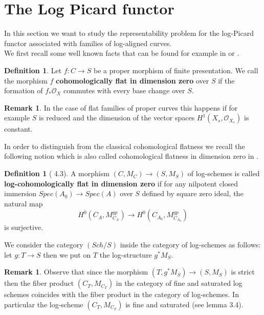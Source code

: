 \documentclass{amsart}
\theoremstyle{definition}
\newtheorem{definition}[thm]{Definition}
\newtheorem{rmk}[thm]{Remark}
\numberwithin{equation}{section}
\begin{document}
\section{The Log Picard functor}\label{chlogpic}

\noindent In this section we want to study the representability problem for the log-Picard functor associated with families of log-aligned curves.\\
We first recall some well known facts that can be found for example in \cite{blr} or \cite{ray}. \\

\begin{definition}\label{cohomofla}
    Let $f:C{\rightarrow} S$ be a proper morphism of finite presentation. We call the morphism $f$ \textbf{cohomologically flat in dimension zero} over $S$ if the formation of $f_{*}{\mathcal{O}}_X$ commutes with every base change over $S$.
\end{definition}
\begin{rmk}
In the case of flat families of proper curves this happens if for example $S$ is reduced and the dimension of the vector spaces $H^1(X_s,{\mathcal{O}}_{X_s})$ is constant.
\end{rmk}
\noindent In order to distinguish from the classical cohomological flatness we recall the following notion which is also called cohomological flatness in dimension zero in \cite{olpic}.
\begin{definition}[\cite{olpic} 4.3]\label{logcohfl}
A morphism $(C,M_C){\rightarrow} (S,M_S)$ of log-schemes is called \textbf{log-cohomologically flat in dimension zero} if for any nilpotent closed immersion $Spec(A_0){\rightarrow} Spec(A)$ over $S$ defined by square zero ideal, the natural map
$$
H^0(C_A,M_{C_A}^{gp}){\rightarrow} H^0(C_{A_0},M_{C_{A_0}}^{gp})
$$
is surjective.
\end{definition}
We consider the category $(Sch/S)$ inside the category of log-schemes as follows: let $g:T{\rightarrow} S$ then we put on $T$ the log-structure $g^{*}M_S$.\\
\begin{rmk}\label{univsat}
    Observe that since the morphism $(T,g^{*}M_S){\rightarrow} (S,M_S)$ is strict then the fiber product $(C_T,M_{C_T})$ in the category of fine and saturated log schemes coincides with the fiber product in the category of log-schemes. In particular the log-scheme $(C_T,M_{C_T})$ is fine and saturated (see \cite{fka} lemma 3.4). 
\end{rmk}
\end{document}
